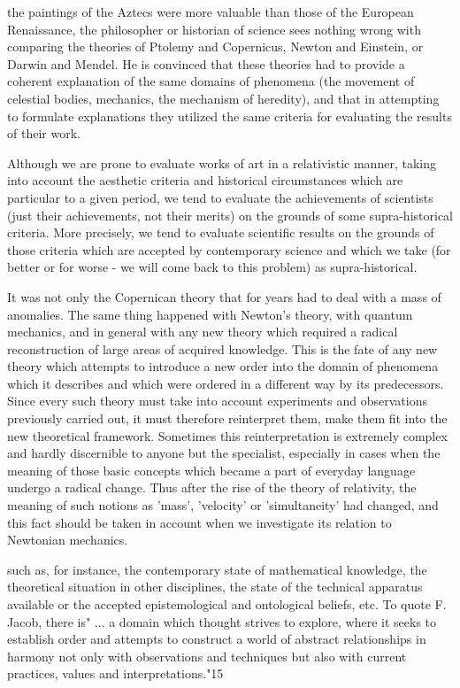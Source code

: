 the paintings of the Aztecs were more valuable than those of the European  Renaissance, the philosopher or historian of science sees nothing wrong  with comparing the theories of Ptolemy and Copernicus, Newton and  Einstein, or Darwin and Mendel. He is convinced that these theories had  to provide a coherent explanation of the same domains of phenomena (the  movement of celestial bodies, mechanics, the mechanism of heredity),  and that in attempting to formulate explanations they utilized the same  criteria for evaluating the results of their work.

Although we are prone to evaluate works of art in a relativistic manner,  taking into account the aesthetic criteria and historical circumstances  which are particular to a given period, we tend to evaluate the achievements of scientists (just their achievements, not their merits) on the grounds  of some supra-historical criteria. More precisely, we tend to evaluate  scientific results on the grounds of those criteria which are accepted by  contemporary science and which we take (for better or for worse - we  will come back to this problem) as supra-historical.

It was not only the Copernican theory that for years had to deal with a  mass of anomalies. The same thing happened with Newton's theory, with  quantum mechanics, and in general with any new theory which required a  radical reconstruction of large areas of acquired knowledge. This is the  fate of any new theory which attempts to introduce a new order into the  domain of phenomena which it describes and which were ordered in a  different way by its predecessors. Since every such theory must take into  account experiments and observations previously carried out, it must  therefore reinterpret them, make them fit into the new theoretical framework. Sometimes this reinterpretation is extremely complex and hardly  discernible to anyone but the specialist, especially in cases when the meaning of those basic concepts which became a part of everyday language  undergo a radical change. Thus after the rise of the theory of relativity, the  meaning of such notions as 'mass', 'velocity' or 'simultaneity' had  changed, and this fact should be taken in account when we investigate its  relation to Newtonian mechanics.

such as, for instance, the contemporary state of mathematical knowledge,  the theoretical situation in other disciplines, the state of the technical  apparatus available or the accepted epistemological and ontological  beliefs, etc. To quote F. Jacob, there is" ... a domain which thought strives  to explore, where it seeks to establish order and attempts to construct a  world of abstract relationships in harmony not only with observations and  techniques but also with current practices, values and interpretations."15


